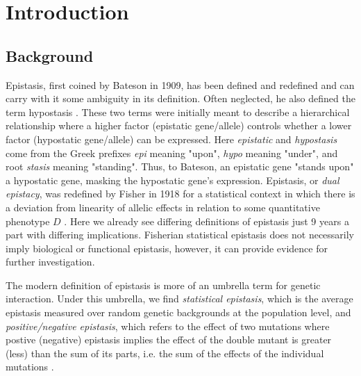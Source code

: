 \documentclass{article}\usepackage[]{graphicx}\usepackage[]{color}
\begin{document}
\newpage
{}
\setcounter{page}{1}

\section{Introduction}
\subsection{Background}
Epistasis, first coined by Bateson in 1909, has been defined and redefined and can carry with it some ambiguity in its definition. Often neglected, he also defined the term hypostasis \cite{batesonMendelsPrinciplesHeredity1909,cordellEpistasisWhatIt2002}. These two terms were initially meant to describe a hierarchical relationship where a higher factor (epistatic gene/allele) controls whether a lower factor (hypostatic gene/allele) can be expressed. Here \textit{epistatic} and \textit{hypostasis} come from the Greek prefixes \textit{epi} meaning "upon", \textit{hypo} meaning "under", and root \textit{stasis} meaning "standing". Thus, to Bateson, an epistatic gene "stands upon" a hypostatic gene, masking the hypostatic gene's expression. Epistasis, or \textit{dual epistacy}, was redefined by Fisher in 1918 for a statistical context in which there is a deviation from linearity of allelic effects in relation to some quantitative phenotype $D$ \cite{cordellEpistasisWhatIt2002,fisherXVTheCorrelationRelatives1919}. Here we already see differing definitions of epistasis just 9 years a part with differing implications. Fisherian statistical epistasis does not necessarily imply biological or functional epistasis, however, it can provide evidence for further investigation. 
\par 
The modern definition of epistasis is more of an umbrella term for genetic interaction. Under this umbrella, we find \textit{statistical epistasis}, which is the average epistasis measured over random genetic backgrounds at the population level, and \textit{positive/negative epistasis}, which refers to the effect of two mutations where postive (negative) epistasis implies the effect of the double mutant is greater (less) than the sum of its parts, i.e. the sum of the effects of the individual mutations \cite{johnsonEpistasisEvolutionRecent2023}.
\end{document}
